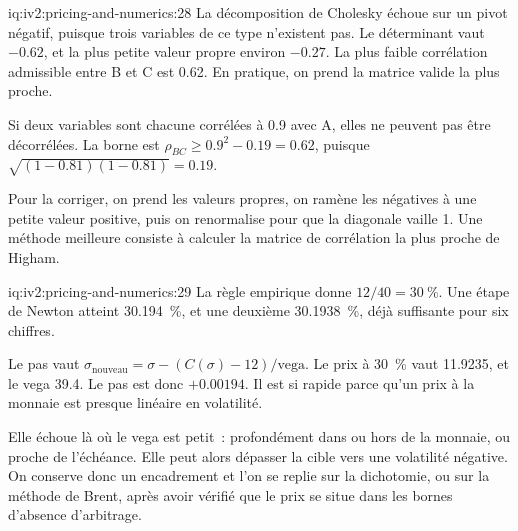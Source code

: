 \begin{solution}{iq:iv2:pricing-and-numerics:28}
La décomposition de Cholesky échoue sur un pivot négatif, puisque trois variables de ce type n'existent pas. Le déterminant vaut $-0.62$, et la plus petite valeur propre environ $-0.27$. La plus faible corrélation admissible entre B et C est 0.62. En pratique, on prend la matrice valide la plus proche.

Si deux variables sont chacune corrélées à 0.9 avec A, elles ne peuvent pas être décorrélées. La borne est $\rho_{BC} \geq 0.9^2 - 0.19 = 0.62$, puisque $\sqrt{(1 - 0.81)(1 - 0.81)} = 0.19$.

Pour la corriger, on prend les valeurs propres, on ramène les négatives à une petite valeur positive, puis on renormalise pour que la diagonale vaille 1. Une méthode meilleure consiste à calculer la matrice de corrélation la plus proche de Higham.

\end{solution}

\begin{solution}{iq:iv2:pricing-and-numerics:29}
La règle empirique donne $12/40 = 30~\%$. Une étape de Newton atteint 30.194~\%, et une deuxième 30.1938~\%, déjà suffisante pour six chiffres.

Le pas vaut $\sigma_{\text{nouveau}} = \sigma - (C(\sigma) - 12)/\text{vega}$. Le prix à 30~\% vaut 11.9235, et le vega 39.4. Le pas est donc $+0.00194$. Il est si rapide parce qu'un prix à la monnaie est presque linéaire en volatilité.

Elle échoue là où le vega est petit~: profondément dans ou hors de la monnaie, ou proche de l'échéance. Elle peut alors dépasser la cible vers une volatilité négative. On conserve donc un encadrement et l'on se replie sur la dichotomie, ou sur la méthode de Brent, après avoir vérifié que le prix se situe dans les bornes d'absence d'arbitrage.

\end{solution}


